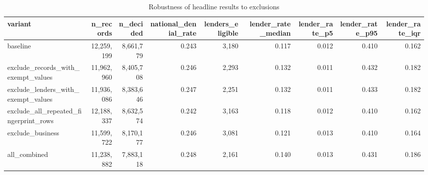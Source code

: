 \begin{table}[t]
\centering
\caption{Robustness of headline results to exclusions}
\label{tab:table9_robustness}
\small
\begin{tabular}{lrrrrrrrr}
\toprule
variant & n\_records & n\_decided & national\_denial\_rate & lenders\_eligible & lender\_rate\_median & lender\_rate\_p5 & lender\_rate\_p95 & lender\_rate\_iqr \\
\midrule
baseline & 12,259,199 & 8,661,779 & 0.243 & 3,180 & 0.117 & 0.012 & 0.410 & 0.162 \\
exclude\_records\_with\_exempt\_values & 11,962,960 & 8,405,708 & 0.246 & 2,293 & 0.132 & 0.011 & 0.432 & 0.182 \\
exclude\_lenders\_with\_exempt\_values & 11,936,086 & 8,383,646 & 0.247 & 2,251 & 0.132 & 0.011 & 0.433 & 0.182 \\
exclude\_all\_repeated\_fingerprint\_rows & 12,188,337 & 8,632,574 & 0.242 & 3,163 & 0.118 & 0.012 & 0.410 & 0.162 \\
exclude\_business & 11,599,722 & 8,170,177 & 0.246 & 3,081 & 0.121 & 0.013 & 0.410 & 0.164 \\
all\_combined & 11,238,882 & 7,883,118 & 0.248 & 2,161 & 0.140 & 0.013 & 0.431 & 0.186 \\
\bottomrule
\end{tabular}
\end{table}
